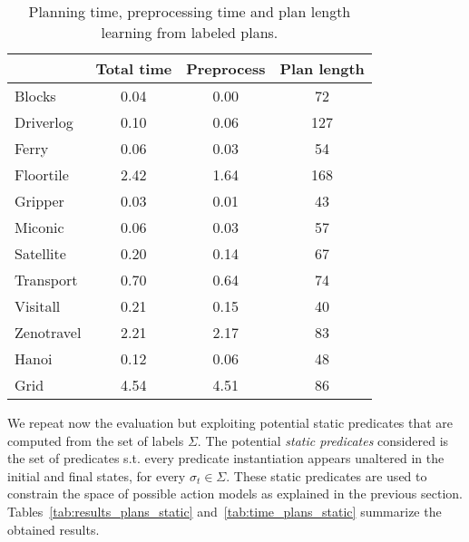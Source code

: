 \documentclass[letterpaper]{article} %
\begin{document}
\begin{table}
\begin{footnotesize}
	\begin{center}
		\begin{tabular}{l|c|c|c|}			
			 & Total time & Preprocess & Plan length  \\
			\hline
			Blocks & 0.04 & 0.00 & 72 \\
			Driverlog & 0.10 & 0.06 & 127 \\
			Ferry & 0.06 & 0.03 & 54 \\
			Floortile & 2.42 & 1.64 & 168 \\
			Gripper & 0.03 & 0.01 & 43 \\
			Miconic & 0.06 & 0.03 & 57 \\
			Satellite & 0.20 & 0.14 & 67 \\
			Transport & 0.70 & 0.64 & 74 \\
			Visitall & 0.21 & 0.15 & 40 \\
			Zenotravel & 2.21 & 2.17 & 83 \\
			Hanoi & 0.12 & 0.06 & 48 \\
			Grid & 4.54 & 4.51 & 86 \\			
		\end{tabular}
	\end{center}
        \end{footnotesize}
	\caption{\small Planning time, preprocessing time and plan length learning from labeled plans.}
	\label{tab:time_plans}	
\end{table}

We repeat now the evaluation but exploiting potential static predicates that are computed from the set of labels $\Sigma$. The potential {\em static predicates} considered is the set of predicates s.t. every predicate instantiation appears unaltered in the initial and final states, for every $\sigma_t\in\Sigma$. These static predicates are used to constrain the space of possible action models as explained in the previous section.  Tables~\ref{tab:results_plans_static} and~\ref{tab:time_plans_static} summarize the obtained results.	
\end{document}
